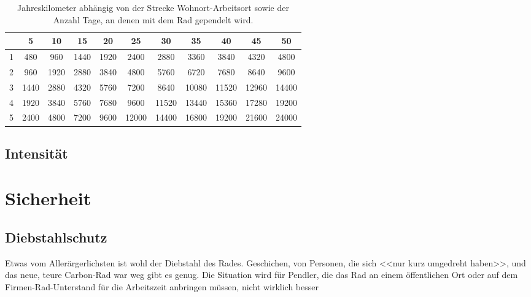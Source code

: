 \documentclass[a4paper,DIV13,BCOR1cm]{scrbook}
\begin{document}
\begin{table}
        \centering
        \begin{tabular}{ccccccccccc}
                \toprule
&	5	& 10	& 15	& 20	& 25	& 30 & 35	& 40	& 45	& 50\\
    \midrule
1 &	480	& 960	& 1440	& 1920	& 2400	& 2880	& 3360	& 3840	& 4320	& 4800 \\
2 &	960 &	1920 &	2880 &	3840 &	4800 &	5760 &	6720 &	7680 &	8640 &	9600 \\
3 &	1440 & 	2880 &	4320 &	5760 &	7200 &	8640 &	10080 &	11520 &	12960 &	14400 \\
4 &	1920 &	3840 &	5760 &	7680 &	9600 &	11520 &	13440 &	15360 &	17280 &	19200 \\
5 &	2400& 	4800 &	7200 &	9600 &	12000 &	14400 &	16800 &	19200 &	21600 &	24000 \\
\bottomrule
        \end{tabular}
        \caption{Jahreskilometer abhängig von der Strecke Wohnort-Arbeitsort sowie der Anzahl Tage, an denen mit dem Rad gependelt wird.}
        \label{tab:jahreskilometer}
\end{table}

\section{Intensität}



\chapter{Sicherheit}

\section{Diebstahlschutz}

Etwas vom Allerärgerlichsten ist wohl der Diebstahl des Rades. Geschichen,
von Personen, die sich <<nur kurz umgedreht haben>>, und das neue, teure
Carbon-Rad war weg gibt es genug. Die Situation wird für Pendler, die das
Rad an einem öffentlichen Ort oder auf dem Firmen-Rad-Unterstand für die
Arbeitszeit anbringen müssen, nicht wirklich besser
\end{document}
